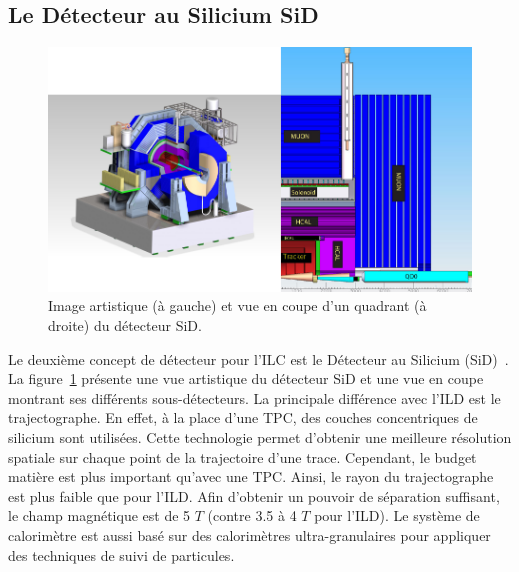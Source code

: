 \subsection{Le Détecteur au Silicium SiD}
\begin{figure}[!ht]
  \begin{center}
    \includegraphics[width=1.0\textwidth]{ILC/figs/sid.png}
    \caption{Image artistique (à gauche) et vue en coupe d'un quadrant (à droite) du détecteur SiD.}
    \label{fig:sid-scheme}
  \end{center}
\end{figure}
Le deuxième concept de détecteur pour l'ILC est le Détecteur au Silicium (SiD)~\cite{detectorTDR}. La figure~\ref{fig:sid-scheme} présente une vue artistique du détecteur SiD et une vue en coupe montrant ses différents sous-détecteurs. La principale différence avec l'ILD est le trajectographe. En effet, à la place d'une TPC, des couches concentriques de silicium sont utilisées. Cette technologie permet d'obtenir une meilleure résolution spatiale sur chaque point de la trajectoire d'une trace. Cependant, le budget matière est plus important qu'avec une TPC. Ainsi, le rayon du trajectographe est plus faible que pour l'ILD. Afin d'obtenir un pouvoir de séparation suffisant, le champ magnétique est de 5 $T$ (contre 3.5 à 4 $T$ pour l'ILD). Le système de calorimètre est aussi basé sur des calorimètres ultra-granulaires pour appliquer des techniques de suivi de particules. 
\newpage
